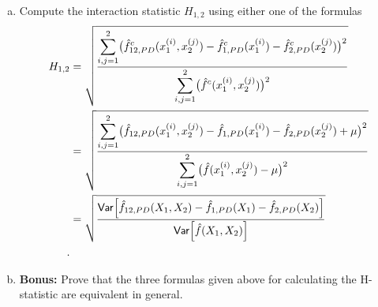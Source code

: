 {\begin{enumerate}[a)]
    \item Compute the interaction statistic $H_{1,2}$ using either one of the formulas
    \[
    \begin{aligned}
        H_{1,2}
        & = \sqrt{
            \frac{\displaystyle
                \sum_{i,j = 1}^2 \bigl(
                \hat f^c_{12,PD}(x_1^{(i)},x_2^{(j)})-
                \hat f^c_{1,PD}(x_1^{(i)})-
                \hat f^c_{2,PD}(x_2^{(j)})
                \bigr)^2
            }{\displaystyle
                \sum_{i,j = 1}^2 \bigl(
                \hat f^c(x_1^{(i)},x_2^{(j)})
                \bigr)^2
            }
        } \\
        & = \sqrt{
            \frac{\displaystyle
                \sum_{i,j = 1}^2 \bigl(
                \hat f_{12,PD}(x_1^{(i)},x_2^{(j)})-
                \hat f_{1,PD}(x_1^{(i)})-
                \hat f_{2,PD}(x_2^{(j)})+\mu
                \bigr)^2
            }{\displaystyle
                \sum_{i,j = 1}^2 \bigl(
                \hat f(x_1^{(i)},x_2^{(j)})-\mu
                \bigr)^2
            }
        } \\
        & = \sqrt{
            \frac{\mathsf{Var} \Bigl[
                \hat f_{12,PD}(X_1, X_2)-
                \hat f_{1,PD}(X_1)-
                \hat f_{2,PD}(X_2)
                \Bigr]
            }{\mathsf{Var} \Bigl[
                \hat f( X_1, X_2 )
                \Bigr]
            }
        } \\.  
    \end{aligned}
    \]

    \item \textbf{Bonus:} Prove that the three formulas given above for calculating the H-statistic are equivalent in general.
    
\end{enumerate}

}